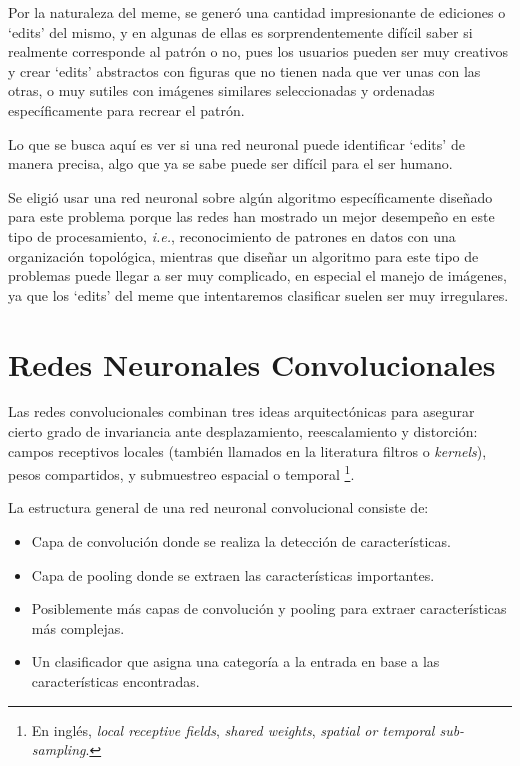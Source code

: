 \documentclass[spanish,11pt,letterpaper]{article}
\begin{document}
Por la naturaleza del meme, se generó una cantidad impresionante de ediciones o `edits' del mismo,
y en algunas de ellas es sorprendentemente difícil saber si realmente corresponde al patrón o no, pues
los usuarios pueden ser muy creativos y crear `edits' abstractos con figuras
que no tienen nada que ver unas con las otras, o muy sutiles con imágenes similares seleccionadas y
ordenadas específicamente para recrear el patrón.

Lo que se busca aquí es ver si una red neuronal puede identificar `edits' de manera precisa, algo que
ya se sabe puede ser difícil para el ser humano.

Se eligió usar una red neuronal sobre algún algoritmo específicamente diseñado para este problema porque las redes han mostrado un mejor desempeño en este tipo de procesamiento, \textit{i.e.},
reconocimiento de patrones en datos con una organización topológica, mientras que diseñar un algoritmo para este tipo de problemas puede llegar a ser muy complicado, en especial el
manejo de imágenes, ya que los `edits' del meme que intentaremos clasificar suelen ser muy irregulares.

\section{Redes Neuronales Convolucionales\cite{lecun}}

Las redes convolucionales combinan tres ideas arquitectónicas para asegurar cierto
grado de invariancia ante desplazamiento, reescalamiento y distorción: campos
receptivos locales (también llamados en la literatura filtros o \textit{kernels}),
pesos compartidos, y submuestreo espacial o temporal%
\footnote{En inglés, \textit{local receptive fields}, \textit{shared weights},
\textit{spatial or temporal sub-sampling}.}.

La estructura general de una red neuronal convolucional consiste de:
\begin{itemize}
  \item Capa de convolución donde se realiza la detección de características.
  \item Capa de pooling donde se extraen las características importantes.
  \item Posiblemente más capas de convolución y pooling para extraer características
  más complejas.
  \item Un clasificador que asigna una categoría a la entrada en base a las
  características encontradas.
\end{itemize}
\end{document}
